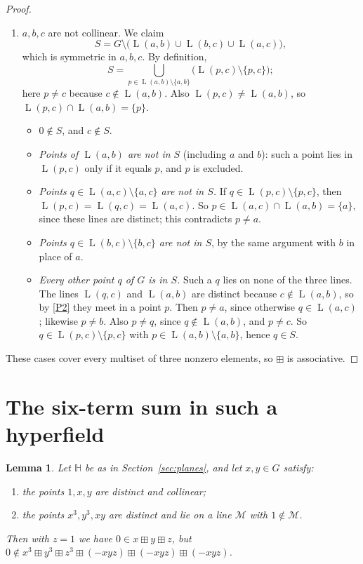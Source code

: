 \documentclass[11pt]{article}
\newtheorem{lemma}[theorem]{Lemma}
\theoremstyle{definition}
\theoremstyle{remark}
\newcommand{\HH}{\mathbb{H}}
\newcommand{\bp}{\boxplus}
\DeclareMathOperator{\Ln}{L}
\begin{document}
\begin{proof}
\begin{enumerate}[label=\textup{Case \arabic*.},ref=\arabic*,leftmargin=*]
\item\label{case4} $a,b,c$ are not collinear. We claim
\[
S=G\setminus\bigl(\Ln(a,b)\cup\Ln(b,c)\cup\Ln(a,c)\bigr),
\]
which is symmetric in $a,b,c$. By definition,
\[
S=\bigcup_{p\in\Ln(a,b)\setminus\{a,b\}}\bigl(\Ln(p,c)\setminus\{p,c\}\bigr);
\]
here $p\neq c$ because $c\notin\Ln(a,b)$. Also $\Ln(p,c)\neq\Ln(a,b)$, so $\Ln(p,c)\cap\Ln(a,b)=\{p\}$.
\begin{itemize}[nosep]
\item $0\notin S$, and $c\notin S$.
\item \emph{Points of $\Ln(a,b)$ are not in $S$} (including $a$ and $b$): such a point lies in $\Ln(p,c)$ only if it equals $p$, and $p$ is excluded.
\item \emph{Points $q\in\Ln(a,c)\setminus\{a,c\}$ are not in $S$.} If $q\in\Ln(p,c)\setminus\{p,c\}$, then $\Ln(p,c)=\Ln(q,c)=\Ln(a,c)$. So $p\in\Ln(a,c)\cap\Ln(a,b)=\{a\}$, since these lines are distinct; this contradicts $p\neq a$.
\item \emph{Points $q\in\Ln(b,c)\setminus\{b,c\}$ are not in $S$}, by the same argument with $b$ in place of $a$.
\item \emph{Every other point $q$ of $G$ is in $S$.} Such a $q$ lies on none of the three lines. The lines $\Ln(q,c)$ and $\Ln(a,b)$ are distinct because $c\notin\Ln(a,b)$, so by \ref{P2} they meet in a point $p$. Then $p\neq a$, since otherwise $q\in\Ln(a,c)$; likewise $p\neq b$. Also $p\neq q$, since $q\notin\Ln(a,b)$, and $p\neq c$. So $q\in\Ln(p,c)\setminus\{p,c\}$ with $p\in\Ln(a,b)\setminus\{a,b\}$, hence $q\in S$.
\end{itemize}
\end{enumerate}
These cases cover every multiset of three nonzero elements, so $\bp$ is associative.
\end{proof}

\section{The six-term sum in such a hyperfield}

\begin{lemma}\label{lem:sixterm}
Let $\HH$ be as in Section~\ref{sec:planes}, and let $x,y\in G$ satisfy:
\begin{enumerate}[label=\textup{(\roman*)},nosep]
\item the points $1,x,y$ are distinct and collinear;
\item the points $x^3,y^3,xy$ are distinct and lie on a line $\mathcal M$ with $1\notin\mathcal M$.
\end{enumerate}
Then with $z=1$ we have $0\in x\bp y\bp z$, but $0\notin x^3\bp y^3\bp z^3\bp(-xyz)\bp(-xyz)\bp(-xyz)$.
\end{lemma}
\end{document}
